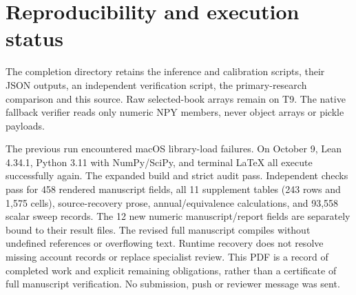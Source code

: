 \documentclass[11pt]{article}
\begin{document}
\section{Reproducibility and execution status}
The completion directory retains the inference and calibration scripts, their JSON outputs, an independent verification script, the primary-research comparison and this source. Raw selected-book arrays remain on T9. The native fallback verifier reads only numeric NPY members, never object arrays or pickle payloads.

The previous run encountered macOS library-load failures. On October 9, Lean 4.34.1, Python 3.11 with NumPy/SciPy, and terminal LaTeX all execute successfully again. The expanded build and strict audit pass. Independent checks pass for 458 rendered manuscript fields, all 11 supplement tables (243 rows and 1,575 cells), source-recovery prose, annual/equivalence calculations, and 93,558 scalar sweep records. The 12 new numeric manuscript/report fields are separately bound to their result files. The revised full manuscript compiles without undefined references or overflowing text. Runtime recovery does not resolve missing account records or replace specialist review. This PDF is a record of completed work and explicit remaining obligations, rather than a certificate of full manuscript verification. No submission, push or reviewer message was sent.
\end{document}
